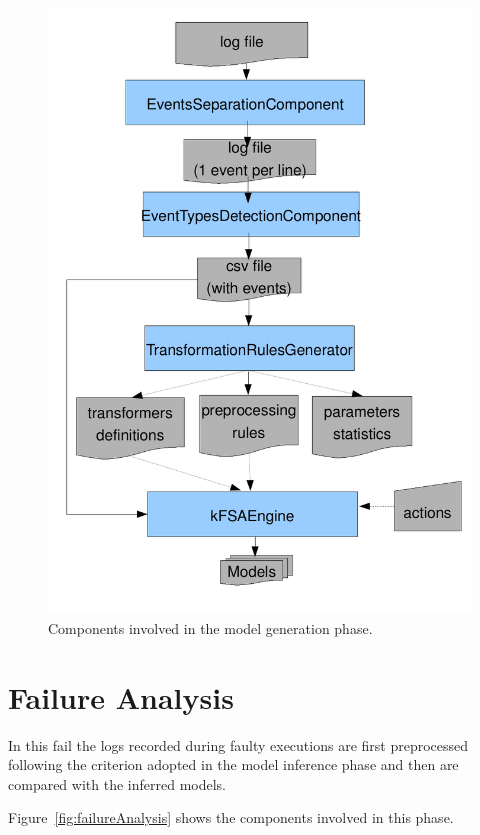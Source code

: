 \begin{figure}[ht!]
    \begin{center}
        \includegraphics[width=12cm]{images/modelGeneration}
    \end{center}
    \caption{Components involved in the model generation phase.}
\label{fig:modelGenerationComponents}
\end{figure}

\section{Failure Analysis}

In this fail the logs recorded during faulty executions are first
preprocessed following the criterion adopted in the model inference
phase and then are compared with the inferred models.

Figure~\ref{fig:failureAnalysis} shows the components involved in this
phase.


